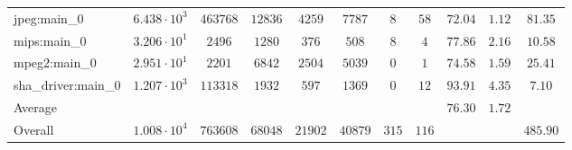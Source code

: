 \begin{tabular}{|l|c|c|c|c|c|c|c|c|c|c|}
jpeg:main\_0            & $ 6.438 \cdot 10^{3} $ & $ 463768 $ & $ 12836 $ & $ 4259  $ & $ 7787  $ & $ 8   $ & $ 58  $ & $ 72.04       $ & $ 1.12    $ & $ 81.35   $ \\
mips:main\_0            & $ 3.206 \cdot 10^{1} $ & $ 2496   $ & $ 1280  $ & $ 376   $ & $ 508   $ & $ 8   $ & $ 4   $ & $ 77.86       $ & $ 2.16    $ & $ 10.58   $ \\
mpeg2:main\_0           & $ 2.951 \cdot 10^{1} $ & $ 2201   $ & $ 6842  $ & $ 2504  $ & $ 5039  $ & $ 0   $ & $ 1   $ & $ 74.58       $ & $ 1.59    $ & $ 25.41   $ \\
sha\_driver:main\_0     & $ 1.207 \cdot 10^{3} $ & $ 113318 $ & $ 1932  $ & $ 597   $ & $ 1369  $ & $ 0   $ & $ 12  $ & $ 93.91       $ & $ 4.35    $ & $ 7.10    $ \\
\hline
Average                 & $                    $ & $        $ & $       $ & $       $ & $       $ & $     $ & $     $ & $ 76.30       $ & $ 1.72    $ & $         $ \\
\hline
Overall                 & $ 1.008 \cdot 10^{4} $ & $ 763608 $ & $ 68048 $ & $ 21902 $ & $ 40879 $ & $ 315 $ & $ 116 $ & $             $ & $         $ & $ 485.90  $ \\
\hline
\end{tabular}

